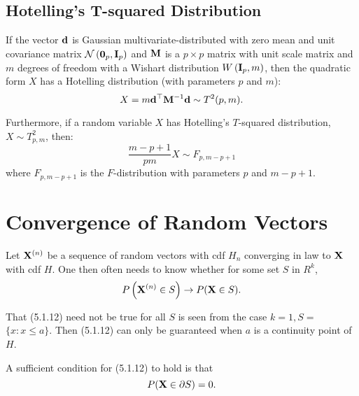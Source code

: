 \subsection{Hotelling's T-squared Distribution}

\begin{definition}
	If the vector ${\bf d}$ is Gaussian multivariate-distributed with zero mean and unit covariance matrix ${\mathcal N}\left(\mathbf{0}_p,{\bf I}_{p}\right)$ and ${\bf M}$ is a $p\times p$ matrix with unit scale matrix and $m$ degrees of freedom with a Wishart distribution $W\left({\bf I}_{p},m\right)$, then the quadratic form $X$ has a Hotelling distribution (with parameters $p$ and $m$):
	\begin{equation*}
		X=m{\bf d}^{\top}{\bf M}^{-1}{\bf d}\sim T^2(p,m) .
	\end{equation*}

	Furthermore, if a random variable $X$ has Hotelling's $T$-squared distribution, $X \sim T_{p,m}^2$, then:
	\begin{equation*}
		\frac{m-p+1}{pm}X\sim F_{p,m-p+1}
	\end{equation*}
	where $F_{p,m-p+1}$ is the $F$-distribution with parameters $p$ and $m-p+1$.
\end{definition}

\section{Convergence of Random Vectors}

Let ${\bf X}^{(n)}$ be a sequence of random vectors with cdf $H_n$ converging in law to ${\bf X}$ with cdf $H$. One then often needs to know whether for some set $S$ in $R^k$,
\begin{equation*}
	P\left({\bf X}^{(n)} \in S\right) \rightarrow P({\bf X} \in S) .
\end{equation*}

That (5.1.12) need not be true for all $S$ is seen from the case $k=1, S=$ $\{x: x \leq a\}$. Then (5.1.12) can only be guaranteed when $a$ is a continuity point of $H$.
\begin{theorem}
	A sufficient condition for (5.1.12) to hold is that
	\begin{equation*}
		P({\bf X} \in \partial S)=0 .
	\end{equation*}
\end{theorem}

\begin{example}[Multinomial]

\end{example}

